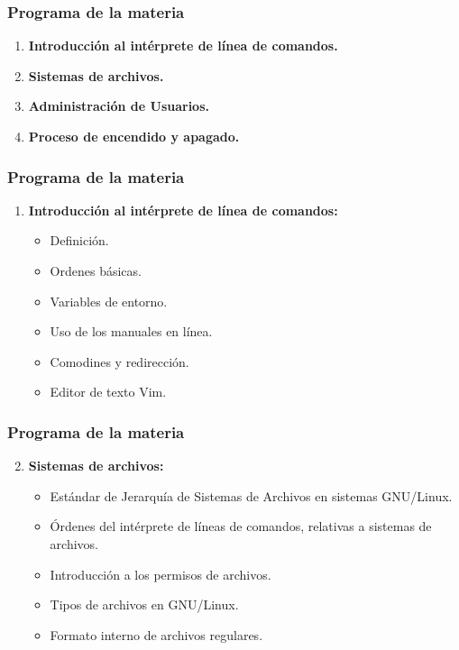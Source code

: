 \documentclass[11pt,a4paper,spanish]{beamer}
\begin{document}
\begin{frame}

    \frametitle{Programa de la materia}

\begin{enumerate}
    \item \textbf{Introducción al intérprete de línea de comandos.}
    \item \textbf{Sistemas de archivos.}
    \item \textbf{Administración de Usuarios.}
    \item \textbf{Proceso de encendido y apagado.}
\end{enumerate}

\end{frame}

\begin{frame}

    \frametitle{Programa de la materia}

\begin{enumerate}
    \item \textbf{Introducción al intérprete de línea de comandos:}
        \begin{itemize}
            \item Definición.
            \item Ordenes básicas.
            \item Variables de entorno.
            \item Uso de los manuales en línea.
            \item Comodines y redirección.
            \item Editor de texto Vim.
        \end{itemize}
\end{enumerate}

\end{frame}

\begin{frame}

    \frametitle{Programa de la materia}

\begin{enumerate}
    \setcounter{enumi}{1}
    \item \textbf{Sistemas de archivos:}
        \begin{itemize}
            \item Estándar de Jerarquía de Sistemas de Archivos en sistemas
                GNU/Linux.
            \item Órdenes del intérprete de líneas de comandos, relativas a
                sistemas de archivos.
            \item Introducción a los permisos de archivos.
            \item Tipos de archivos en GNU/Linux.
            \item Formato interno de archivos regulares.
        \end{itemize}
\end{enumerate}

\end{frame}
\end{document}
